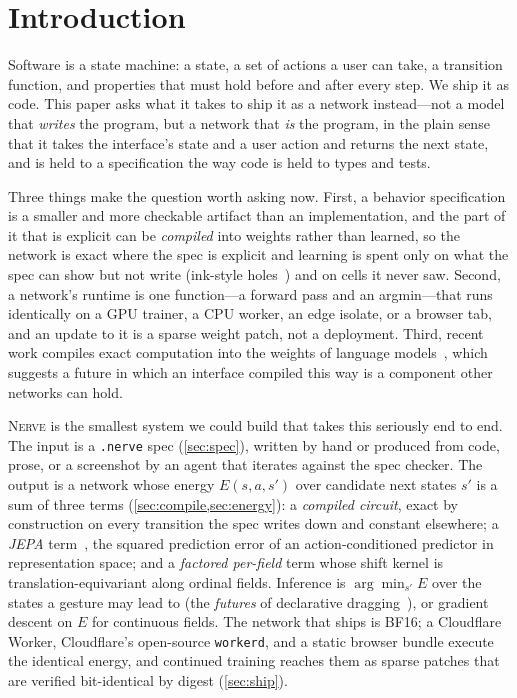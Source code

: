 \documentclass{article}
\theoremstyle{plain}
\theoremstyle{definition}
\theoremstyle{remark}
\newcommand{\method}{\textsc{Nerve}\xspace}
\begin{document}
\section{Introduction}
\label{sec:intro}

Software is a state machine: a state, a set of actions a user can take, a transition function, and properties that must hold before and after every step. We ship it as code. This paper asks what it takes to ship it as a network instead---not a model that \emph{writes} the program, but a network that \emph{is} the program, in the plain sense that it takes the interface's state and a user action and returns the next state, and is held to a specification the way code is held to types and tests.

Three things make the question worth asking now. First, a behavior specification is a smaller and more checkable artifact than an implementation, and the part of it that is explicit can be \emph{compiled} into weights rather than learned, so the network is exact where the spec is explicit and learning is spent only on what the spec can show but not write (ink-style holes~\citep{inklang}) and on cells it never saw. Second, a network's runtime is one function---a forward pass and an argmin---that runs identically on a GPU trainer, a CPU worker, an edge isolate, or a browser tab, and an update to it is a sparse weight patch, not a deployment. Third, recent work compiles exact computation into the weights of language models~\citep{qwenputer,qwengpu,cajal}, which suggests a future in which an interface compiled this way is a component other networks can hold.

\method is the smallest system we could build that takes this seriously end to end. The input is a \texttt{.nerve} spec (\cref{sec:spec}), written by hand or produced from code, prose, or a screenshot by an agent that iterates against the spec checker. The output is a network whose energy $E(s,a,s')$ over candidate next states $s'$ is a sum of three terms (\cref{sec:compile,sec:energy}): a \emph{compiled circuit}, exact by construction on every transition the spec writes down and constant elsewhere; a \emph{JEPA} term~\citep{lecun2022path,assran2023ijepa}, the squared prediction error of an action-conditioned predictor in representation space; and a \emph{factored per-field} term whose shift kernel is translation-equivariant along ordinal fields. Inference is $\arg\min_{s'} E$ over the states a gesture may lead to (the \emph{futures} of declarative dragging~\citep{dragology}), or gradient descent on $E$ for continuous fields. The network that ships is BF16; a Cloudflare Worker, Cloudflare's open-source \texttt{workerd}, and a static browser bundle execute the identical energy, and continued training reaches them as sparse patches that are verified bit-identical by digest (\cref{sec:ship}).
\end{document}
